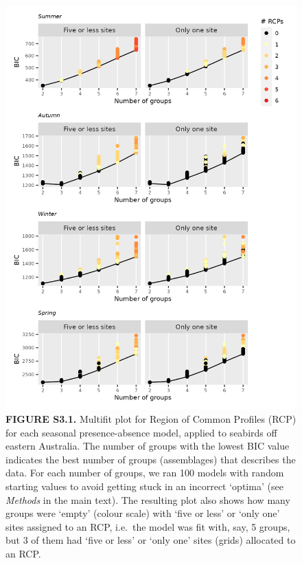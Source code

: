 \documentclass[
]{article}
\begin{document}
\begin{figure}
\centering
\includegraphics{../results/FigS3_1_multifit-Bernoulli.png}
\caption{\textbf{FIGURE S3.1.} Multifit plot for Region of Common
Profiles (RCP) for each seasonal presence-absence model, applied to
seabirds off eastern Australia. The number of groups with the lowest BIC
value indicates the best number of groups (assemblages) that describes
the data. For each number of groups, we ran 100 models with random
starting values to avoid getting stuck in an incorrect `optima' (see
\emph{Methods} in the main text). The resulting plot also shows how many
groups were `empty' (colour scale) with `five or less' or `only one'
sites assigned to an RCP, i.e.~the model was fit with, say, 5 groups,
but 3 of them had `five or less' or `only one' sites (grids) allocated
to an RCP.}
\end{figure}

\newpage
\end{document}
